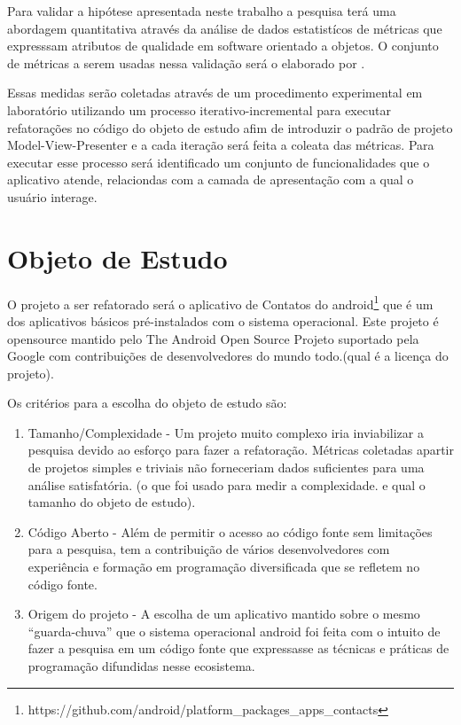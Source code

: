 Para validar a hipótese apresentada neste trabalho a pesquisa terá uma
abordagem quantitativa através da análise de dados estatistícos de métricas 
que expresssam atributos de qualidade em software orientado a objetos. O
conjunto de métricas a serem usadas nessa validação será o elaborado por
.

Essas medidas serão coletadas através de um procedimento experimental em
laboratório utilizando um processo iterativo-incremental para executar
refatorações no código do objeto de estudo afim de introduzir o padrão de
projeto Model-View-Presenter e a cada iteração será feita a coleata das
métricas. Para executar esse processo será identificado um conjunto de
funcionalidades que o aplicativo atende, relaciondas com a camada de
apresentação com a qual o usuário interage.



\section{Objeto de Estudo}


O projeto a ser refatorado será o aplicativo de Contatos do
android\footnote{https://github.com/android/platform_packages_apps_contacts} que é um dos aplicativos básicos pré-instalados com o sistema
operacional. Este projeto é opensource mantido pelo  The Android Open Source
Projeto suportado pela Google com contribuições de desenvolvedores do mundo
todo.(qual é a licença do projeto).

Os critérios para a escolha do objeto de estudo são:

\begin{enumerate}
  \item Tamanho/Complexidade - Um projeto muito complexo iria inviabilizar a
  pesquisa devido ao esforço para fazer a refatoração. Métricas coletadas
  apartir de projetos simples e triviais não forneceriam dados suficientes para
  uma análise satisfatória. (o que foi usado para medir a complexidade. e qual
  o tamanho do objeto de estudo).
  \item Código Aberto - Além de permitir o acesso ao código fonte sem
  limitações para a pesquisa, tem a contribuição de vários desenvolvedores com
  experiência e formação em programação diversificada que se refletem no código fonte.
  \item Origem do projeto - A escolha de um aplicativo mantido sobre o mesmo
  ``guarda-chuva'' que o sistema operacional android foi feita com o intuito de
  fazer a pesquisa em um código fonte que expressasse as técnicas e práticas de
  programação difundidas nesse ecosistema.
\end{enumerate}

